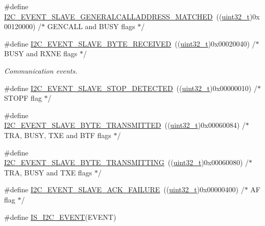 \begin{DoxyCompactItemize}
\item 
\#define \hyperlink{group___i2_c___events_ga15195f6def95f688ae9725899f49ea23}{I2\+C\+\_\+\+E\+V\+E\+N\+T\+\_\+\+S\+L\+A\+V\+E\+\_\+\+G\+E\+N\+E\+R\+A\+L\+C\+A\+L\+L\+A\+D\+D\+R\+E\+S\+S\+\_\+\+M\+A\+T\+C\+H\+ED}~((\hyperlink{_p_e___types_8h_a33594304e786b158f3fb30289278f5af}{uint32\+\_\+t})0x00120000)  /$\ast$ G\+E\+N\+C\+A\+L\+L and B\+U\+S\+Y flags $\ast$/
\item 
\#define \hyperlink{group___i2_c___events_ga8b244626839940569c6c8bbfc4efe21d}{I2\+C\+\_\+\+E\+V\+E\+N\+T\+\_\+\+S\+L\+A\+V\+E\+\_\+\+B\+Y\+T\+E\+\_\+\+R\+E\+C\+E\+I\+V\+ED}~((\hyperlink{_p_e___types_8h_a33594304e786b158f3fb30289278f5af}{uint32\+\_\+t})0x00020040)  /$\ast$ B\+U\+S\+Y and R\+X\+N\+E flags $\ast$/
\begin{DoxyCompactList}\small\item\em Communication events. \end{DoxyCompactList}\item 
\#define \hyperlink{group___i2_c___events_ga3148d8d7087e418959bc31e2646b2941}{I2\+C\+\_\+\+E\+V\+E\+N\+T\+\_\+\+S\+L\+A\+V\+E\+\_\+\+S\+T\+O\+P\+\_\+\+D\+E\+T\+E\+C\+T\+ED}~((\hyperlink{_p_e___types_8h_a33594304e786b158f3fb30289278f5af}{uint32\+\_\+t})0x00000010)  /$\ast$ S\+T\+O\+P\+F flag $\ast$/
\item 
\#define \hyperlink{group___i2_c___events_ga50652880323b8c2746b5afbdfea03fe1}{I2\+C\+\_\+\+E\+V\+E\+N\+T\+\_\+\+S\+L\+A\+V\+E\+\_\+\+B\+Y\+T\+E\+\_\+\+T\+R\+A\+N\+S\+M\+I\+T\+T\+ED}~((\hyperlink{_p_e___types_8h_a33594304e786b158f3fb30289278f5af}{uint32\+\_\+t})0x00060084)  /$\ast$ T\+R\+A, B\+U\+S\+Y, T\+X\+E and B\+T\+F flags $\ast$/
\item 
\#define \hyperlink{group___i2_c___events_gaa574c93a99497649f3d8e7ff53796231}{I2\+C\+\_\+\+E\+V\+E\+N\+T\+\_\+\+S\+L\+A\+V\+E\+\_\+\+B\+Y\+T\+E\+\_\+\+T\+R\+A\+N\+S\+M\+I\+T\+T\+I\+NG}~((\hyperlink{_p_e___types_8h_a33594304e786b158f3fb30289278f5af}{uint32\+\_\+t})0x00060080)  /$\ast$ T\+R\+A, B\+U\+S\+Y and T\+X\+E flags $\ast$/
\item 
\#define \hyperlink{group___i2_c___events_ga249bd611f1ca64653c0bfc606c591088}{I2\+C\+\_\+\+E\+V\+E\+N\+T\+\_\+\+S\+L\+A\+V\+E\+\_\+\+A\+C\+K\+\_\+\+F\+A\+I\+L\+U\+RE}~((\hyperlink{_p_e___types_8h_a33594304e786b158f3fb30289278f5af}{uint32\+\_\+t})0x00000400)  /$\ast$ A\+F flag $\ast$/
\item 
\#define \hyperlink{group___i2_c___events_ga4b42e6936006195f89ff4f763d366970}{I\+S\+\_\+\+I2\+C\+\_\+\+E\+V\+E\+NT}(E\+V\+E\+NT)
\item 

\end{DoxyCompactItemize}

